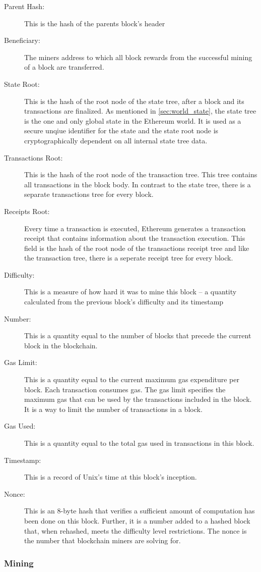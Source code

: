 \begin{description}
	\item[Parent Hash:] This is the hash of the parents block's header
	\item[Beneficiary:] The miners address to which all block rewards from the successful mining of a block are transferred.
	\item[State Root:] This is the hash of the root node of the state tree, after a block and its transactions are finalized. As mentioned in \ref{sec:world_state}, the state tree is the one and only global state in the Ethereum world. It is used as a secure unqiue identifier for the state and the state root node is cryptographically dependent on all internal state tree data.
	\item[Transactions Root:] This is the hash of the root node of the transaction tree. This tree contains all transactions in the block body. In contrast to the state tree, there is a separate transactions tree for every block. 
	\item[Receipts Root:] Every time a transaction is executed, Ethereum generates a transaction receipt that contains information about the transaction execution. This field is the hash of the root node of the transactions receipt tree and like the transaction tree, there is a seperate receipt tree for every block.
	\item[Difficulty:] This is a measure of how hard it was to mine this block – a quantity calculated from the previous block’s difficulty and its timestamp
	\item[Number:] This is a quantity equal to the number of blocks that precede the current block in the blockchain.
	\item[Gas Limit:] This is a quantity equal to the current maximum gas expenditure per block. Each transaction consumes gas. The gas limit specifies the maximum gas that can be used by the transactions included in the block. It is a way to limit the number of transactions in a block.
	\item[Gas Used:] This is a quantity equal to the total gas used in transactions in this block.
	\item[Timestamp:] This is a record of Unix’s time at this block’s inception.
	\item[Nonce:] This is an 8-byte hash that verifies a sufficient amount of computation has been done on this block. Further, it is a number added to a hashed block that, when rehashed, meets the difficulty level restrictions. The nonce is the number that blockchain miners are solving for.
\end{description}

\subsubsection{Mining}
